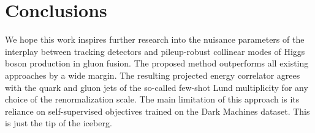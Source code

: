 \section{Conclusions}\label{sec:conclusions}

We hope this work inspires further research into the nuisance parameters
of the interplay between tracking detectors and pileup-robust collinear
modes of Higgs boson production in gluon fusion. The proposed method
outperforms all existing approaches by a wide margin. The resulting
projected energy correlator agrees with the quark and gluon jets of the
so-called few-shot Lund multiplicity for any choice of the
renormalization scale. The main limitation of this approach is its
reliance on self-supervised objectives trained on the Dark Machines
dataset. This is just the tip of the iceberg.

